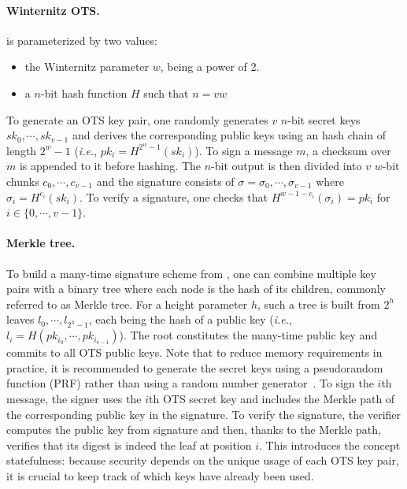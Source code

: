 \paragraph{Winternitz OTS.}
\WOTS is parameterized by two values:
\begin{itemize}
	\item the Winternitz parameter $w$, being a power of 2.%
	\item a $n$-bit hash function $H$ such that $n=vw$
\end{itemize}
To generate an OTS key pair, one randomly generates $v$ $n$-bit secret keys  $sk_0,\cdots,sk_{v-1}$ and derives the corresponding public keys using an hash chain of length $2^w-1$ (\textit{i.e.}, $pk_i = H^{2^w-1}(sk_i)$).
To sign a message $m$, a checksum over $m$ is appended to it before hashing.
The $n$-bit output is then divided into $v$ $w$-bit chunks $c_0,\cdots,c_{v-1}$ and the signature consists of $\sigma = \sigma_0, \cdots, \sigma_{v-1}$ where $\sigma_i = H^{c_i}(sk_i)$. %
To verify a signature, one checks that $H^{w-1-c_i}(\sigma_i) = pk_i$ for $i \in \{0,\cdots,v-1\}$.


\paragraph{Merkle tree.}
To build a many-time signature scheme from \WOTS, one can combine multiple key pairs with a binary tree where each node is the hash of its children, commonly referred to as Merkle tree.
For a height parameter $h$, such a tree is built from $2^h$ leaves $l_0,\cdots,l_{2^h-1}$,  each being the hash of a \WOTS public key (\textit{i.e.}, $l_i = H(pk_{i_0}, \cdots, pk_{i_{v-1}})$).
The root constitutes the many-time public key and commits to all OTS public keys.
Note that to reduce memory requirements in practice, it is recommended to generate the \WOTS secret keys using a pseudorandom function (PRF) rather than using a random number generator~\cite{RFC8391}.
To sign the $i$th message, the signer uses the $i$th OTS secret key and includes the Merkle path of the corresponding public key in the signature.
To verify the signature, the verifier computes the public key from \WOTS signature and then, thanks to the Merkle path, verifies that its digest is indeed the leaf at position $i$.
This introduces the concept statefulness: because security depends on the unique usage of each OTS key pair, it is crucial to keep track of which keys have already been used.


